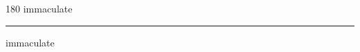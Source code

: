 
\begin{frame}
\begin{center}
\begin{turn}{180}
{\fontsize{2.5cm}{1em}\selectfont immaculate}
\end{turn}
\vspace{1em}\par  
\hrule
\vspace{1em}\par  
{\fontsize{2.5cm}{1em}\selectfont immaculate}
\end{center}
\end{frame}
